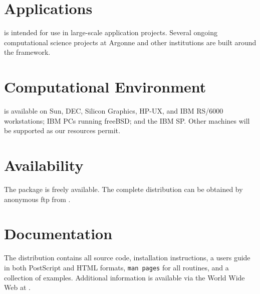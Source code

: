 \section*{Applications}
 is intended for use in large-scale application projects. 
Several ongoing computational science projects at Argonne and
other institutions are built around the  framework.

\section*{Computational Environment}
 is available on Sun, DEC, Silicon Graphics, HP-UX, and IBM
RS/6000 workstations; IBM PCs running freeBSD; and the
IBM SP. Other machines will be supported as our resources permit.

\section*{Availability}

The  package is freely available.
The complete distribution can be obtained by anonymous ftp from 
.

\section*{Documentation}

The  distribution contains all source code, 
installation instructions,
a users guide in both PostScript and HTML formats, 
{\tt man pages} for all routines,
and a collection of examples.
Additional information is available via the World Wide Web at
.
\makeinfo

